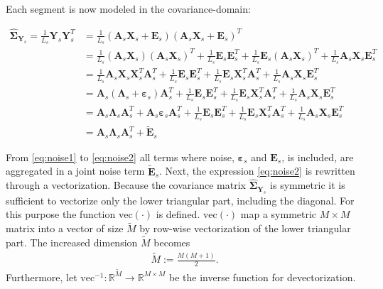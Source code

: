 Each segment is now modeled in the covariance-domain:
\begin{widepage}
\begin{align} 
\widehat{\boldsymbol{\Sigma}}_{\mathbf{Y}_s} = \frac{1}{L_s}\mathbf{Y}_s \mathbf{Y}_s^T &=  \frac{1}{L_s} \left(\mathbf{A}_s \mathbf{X}_s + \mathbf{E}_s\right) \left(\mathbf{A}_s \mathbf{X}_s + \mathbf{E}_s\right)^T \nonumber \\ 
&= \frac{1}{L_s} \left(\mathbf{A}_s \mathbf{X}_s\right) \left(\mathbf{A}_s \mathbf{X}_s\right)^T +\frac{1}{L_s} \mathbf{E}_s \mathbf{E}_s^T + \frac{1}{L_s} \mathbf{E}_s \left(\mathbf{A}_s \mathbf{X}_s\right)^T + \frac{1}{L_s} \mathbf{A}_s \mathbf{X}_s \mathbf{E}_s^T  \nonumber \\
&= \frac{1}{L_s} \mathbf{A}_s \mathbf{X}_s \mathbf{X}_s^T \mathbf{A}_s^T + \frac{1}{L_s} \mathbf{E}_s \mathbf{E}_s^T + \frac{1}{L_s} \mathbf{E}_s \mathbf{X}_s^T \mathbf{A}_s^T + \frac{1}{L_s} \mathbf{A}_s \mathbf{X}_s \mathbf{E}_s^T  \nonumber \\
&= \mathbf{A}_s \left(\boldsymbol{\Lambda}_s + \boldsymbol{\varepsilon}_s\right) \mathbf{A}_s^T + \frac{1}{L_s} \mathbf{E}_s \mathbf{E}_s^T + \frac{1}{L_s} \mathbf{E}_s \mathbf{X}_s^T \mathbf{A}_s^T + \frac{1}{L_s} \mathbf{A}_s \mathbf{X}_s \mathbf{E}_s^T \nonumber \\
&= \mathbf{A}_s \boldsymbol{\Lambda}_s \mathbf{A}_s^T + \mathbf{A}_s \boldsymbol{\varepsilon}_s \mathbf{A}_s^T + \frac{1}{L_s} \mathbf{E}_s \mathbf{E}_s^T +\frac{1}{L_s} \mathbf{E}_s \mathbf{X}_s^T \mathbf{A}_s^T + \frac{1}{L_s} \mathbf{A}_s \mathbf{X}_s \mathbf{E}_s^T \label{eq:noise1} \\
&= \mathbf{A}_s \boldsymbol{\Lambda}_s \mathbf{A}_s^T + \widetilde{\mathbf{E}}_s \label{eq:noise2}
\end{align}
\end{widepage}
From \eqref{eq:noise1} to \eqref{eq:noise2} all terms where noise, $\boldsymbol{\varepsilon}_s$ and $\mathbf{E}_s$, is included, are aggregated in a joint noise term $\widetilde{\mathbf{E}}_s$. 
Next, the expression \eqref{eq:noise2} is rewritten through a vectorization. 
Because the covariance matrix $\widehat{\boldsymbol{\Sigma}}_{\mathbf{Y}_s}$ is symmetric it is sufficient to vectorize only the lower triangular part, including the diagonal. 
For this purpose the function $\text{vec}(\cdot)$ is defined. $\text{vec}(\cdot)$ map a symmetric $M \times M$ matrix into a vector of size $\widetilde{M}$ by row-wise vectorization of the lower triangular part. The increased dimension $\widetilde{M}$ becomes 
\begin{align}
\widetilde{M} := \frac{M(M+1)}{2}.
\end{align}
Furthermore, let $\text{vec}^{-1}: \mathbb{R}^{\widetilde{M}} \rightarrow \mathbb{R}^{M\times M}$ be the inverse function for devectorization. 

